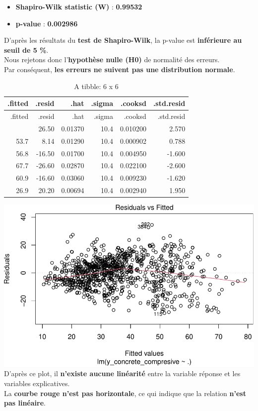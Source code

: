 \documentclass[
  12pt,
]{article}
\providecommand{\tightlist}{%
  \setlength{\itemsep}{0pt}\setlength{\parskip}{0pt}}
\begin{document}
\begin{itemize}
\tightlist
\item
  \textbf{Shapiro-Wilk statistic (W)} : \textbf{0.99532}\\
\item
  \textbf{p-value} : \textbf{0.002986}
\end{itemize}

D'après les résultats du \textbf{test de Shapiro-Wilk}, la p-value est
\textbf{inférieure au seuil de 5 \%}.\\
Nous rejetons donc l'\textbf{hypothèse nulle (H0)} de normalité des
erreurs.\\
Par conséquent, \textbf{les erreurs ne suivent pas une distribution
normale}.

\begin{longtable}[]{@{}rrrrrr@{}}
\caption{A tibble: 6 x 6}\tabularnewline
\toprule\noalign{}
.fitted & .resid & .hat & .sigma & .cooksd & .std.resid \\
\midrule\noalign{}
\endfirsthead
\toprule\noalign{}
.fitted & .resid & .hat & .sigma & .cooksd & .std.resid \\
\midrule\noalign{}
\endhead
\bottomrule\noalign{}
\endlastfoot
53.5 & 26.50 & 0.01370 & 10.4 & 0.010200 & 2.570 \\
53.7 & 8.14 & 0.01290 & 10.4 & 0.000902 & 0.788 \\
56.8 & -16.50 & 0.01700 & 10.4 & 0.004950 & -1.600 \\
67.7 & -26.60 & 0.02870 & 10.4 & 0.022100 & -2.600 \\
60.9 & -16.60 & 0.03060 & 10.4 & 0.009230 & -1.620 \\
26.9 & 20.20 & 0.00694 & 10.4 & 0.002940 & 1.950 \\
\end{longtable}

\includegraphics{rmd_final_files/figure-latex/unnamed-chunk-25-1.pdf}
D'après ce plot, il \textbf{n'existe aucune linéarité} entre la variable
réponse et les variables explicatives.\\
La \textbf{courbe rouge n'est pas horizontale}, ce qui indique que la
relation \textbf{n'est pas linéaire}.
\end{document}
